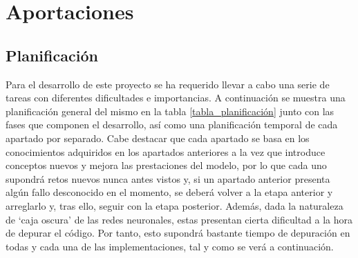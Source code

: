 \chapter{Aportaciones}

\section{Planificación}

Para el desarrollo de este proyecto se ha requerido llevar a cabo una serie de tareas con diferentes dificultades e importancias. A continuación se muestra una planificación general del mismo en la tabla \ref{tabla_planificación} junto con las fases que componen el desarrollo, así como una planificación temporal de cada apartado por separado. Cabe destacar que cada apartado se basa en los conocimientos adquiridos en los apartados anteriores a la vez que introduce conceptos nuevos y mejora las prestaciones del modelo, por lo que cada uno supondrá retos nuevos nunca antes vistos y, si un apartado anterior presenta algún fallo desconocido en el momento, se deberá volver a la etapa anterior y arreglarlo y, tras ello, seguir con la etapa posterior. Además, dada la naturaleza de `caja oscura' de las redes neuronales, estas presentan cierta dificultad a la hora de depurar el código. Por tanto, esto supondrá bastante tiempo de depuración en todas y cada una de las implementaciones, tal y como se verá a continuación.

